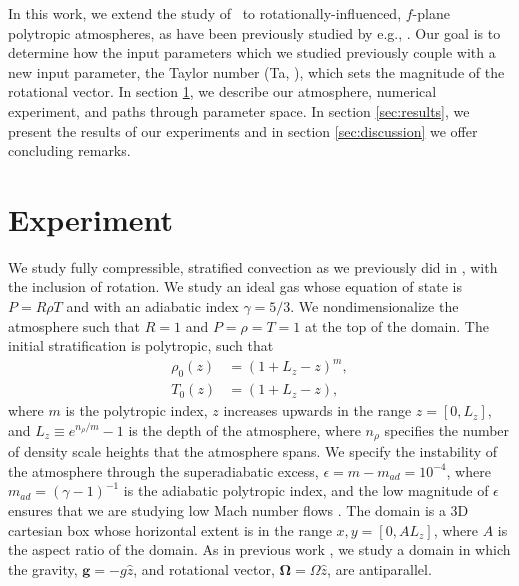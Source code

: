 \documentclass[twocolumn, amsmath, amsfonts, amssymb]{aastex62}
\begin{document}
In this work, we extend the study of \AB$\,$ to rotationally-influenced, $f$-plane
polytropic atmospheres, as have been previously studied by e.g.,
\cite{brummell&all1996, brummell&all1998, calkins&all2015a}. Our goal is to determine
how the input parameters which we studied previously couple with a new input
parameter, the Taylor number (Ta, \cite{julien&all1996}), which sets the magnitude of the
rotational vector. In section  \ref{sec:experiment}, we describe our atmosphere, numerical
experiment, and paths through parameter space. In section \ref{sec:results}, we present
the results of our experiments and in section \ref{sec:discussion} we offer concluding remarks.

\section{Experiment} 
\label{sec:experiment}
We study fully compressible, stratified 
convection as we previously did in \AB, with 
the inclusion of rotation. We study an ideal gas whose
equation of state is $P = R \rho T$ and with an adiabatic
index $\gamma = 5/3$. We nondimensionalize the atmosphere such that
$R = 1$ and $P = \rho = T = 1$ at the top of the domain.
The initial stratification is polytropic, such that
\begin{equation}
\begin{split}
\rho_0(z) &= (1 + L_z - z)^m, \\
T_0(z)    &= (1 + L_z - z),
\label{eqn:polytrope}
\end{split}
\end{equation}
where $m$ is the polytropic index,
$z$ increases upwards in the range $z = [0, L_z]$, and
$L_z \equiv e^{n_\rho/m} - 1$ is the depth of the atmosphere,
where $n_\rho$ specifies the number of density scale heights that the
atmosphere spans. We specify the instability of the atmosphere
through the superadiabatic excess, $\epsilon = m - m_{ad} = 10^{-4}$, where
$m_{ad} = (\gamma-1)^{-1}$ is the adiabatic polytropic index, and
the low magnitude of $\epsilon$ ensures that we are studying 
low Mach number flows .
The domain is a 3D cartesian box whose horizontal extent is in the range
$x, y = [0, AL_z]$, where $A$ is the aspect ratio of the domain.
As in previous work \citep{julien&all1996, brummell&all1996}, 
we study a domain in which the
gravity, $\bm{g} = -g\hat{z}$, and rotational vector, $\bm{\Omega} = \Omega \hat{z}$, 
are antiparallel.
\end{document}
